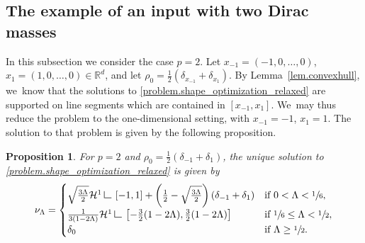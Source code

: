\documentclass[JEP,XML,SOM,Unicode,NoFloatCountersInSection,published]{cedram}
\newtheorem{proposition}[theorem]{Proposition}
\theoremstyle{definition}
\newcommand\LM[1]{\hbox{\vrule width.5pt \vbox to#1pt{\vfill \hrule width#1pt height.5pt}}}
\newcommand\LL{{\mathchoice {\>\LM7\>}{\>\LM7\>}{\,\LM5\,}{\,\LM{3.35}\,}}}
\newcommand{\mres}{\LL}
\newcommand\cH{\mathcal{H}}
\newcommand{\RR}{\mathbb{R}}
\newcommand{\ci}[2]{ \left[ #1, #2 \right] }
\begin{document}
\subsection{The example of an input with two Dirac masses}
In this subsection we consider the case $p=2$. Let $x_{-1}=(-1,0,\ldots, 0)$, $x_{1}=(1,0,\ldots,0) \in \RR^d$, and let $\rho_0=\frac{1}{2}\left(\delta_{x_{-1}}+\delta_{x_{1}}\right)$. By Lemma~\ref{lem.convexhull}, we~know that the solutions to \eqref{problem.shape_optimization_relaxed} are supported on line segments which are contained in $\ci{x_{-1}}{x_1}$. We~may thus reduce the problem to the one-dimensional setting, with $x_{-1}=-1$, $x_{1}=1$. The solution to that problem is given by the following proposition.

\begin{proposition}
For $p=2$ and $\rho_0=\frac{1}{2}\left(\delta_{-1}+\delta_{1}\right)$, the unique solution to \eqref{problem.shape_optimization_relaxed} is given by
\begin{align}
\nu_\Lambda = \begin{cases}
\sqrt{\frac{3\Lambda}{2}}\cH^1\mres\ci{-1}{1} + \left(\frac{1}{2}-\sqrt{\frac{3\Lambda}{2}}\right)(\delta_{-1}+\delta_1) & \mbox{if $0<\Lambda<\sfrac{1}{6}$},\\
\frac{1}{3(1-2\Lambda)}\cH^1\mres\ci{-\frac{3}{2}(1-2\Lambda)}{\frac{3}{2}(1-2\Lambda)} &\mbox{if $\sfrac{1}{6}\le \Lambda <\sfrac{1}{2}$},\\
\delta_0 & \mbox{if $\Lambda\geq \sfrac{1}{2}$}.
\end{cases} \label{eq:}
\end{align}
\end{proposition}
\end{document}
